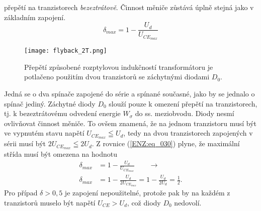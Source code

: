     přepětí na tranzistorech \emph{bezeztrátově}. Činnost měniče zůstává úplně stejná jako v 
    základním zapojení.
    \begin{equation}
      \delta_{max} = 1-\frac{U_d}{U_{CE_{max}}}
    \end{equation}
    \begin{figure}[ht!]
      \centering
      \texttt{[image: flyback\_2T.png]}
      \caption{Přepětí způsobené rozptylovou indukčností transformátoru je potlačeno použitím 
               dvou tranzistorů se záchytnými diodami \(D_0\).}
      \label{ENZ:fig_013}
    \end{figure} 
    Jedná se o dva spínače zapojené do série a spínané současné, jako by se jednalo o spínač 
    jediný. Záchytné diody \(D_0\) slouží pouze k omezení přepětí na tranzistorech, tj. k 
    bezeztrátovému odvedení energie \(W_\sigma\) do ss. meziobvodu. Diody nesmí ovlivňovat 
    činnost měniče. To ovšem znamená, že na jednom tranzistoru musí být ve vypnutém stavu napětí 
    \(U_{CE_{max}}\leqq U_d\), tedy na dvou tranzistorech zapojených v sérii musí být 
    \(2U_{CE_{max}}\leqq 2U_d\). Z rovnice (\ref{ENZ:eq_030}) plyne, že maximální střída musí být 
    omezena na hodnotu
    \begin{align}\label{ENZ:eq_034}
      \delta_{max} &= 1-\frac{U_d}{U_{CE_{max}}} \qquad \rightarrow   \nonumber \\
      \delta_{max} &= 1-\frac{U_d}{2U_{CE_{max}}} = 1 - \frac{U_d}{2U_d} = \frac{1}{2}.
    \end{align}
    Pro případ \(\delta > 0,5\) je zapojení nepoužitelné, protože pak by na každém z tranzistorů 
    muselo být napětí \(U_{CE} > U_d\), což diody \(D_0\) nedovolí.  
